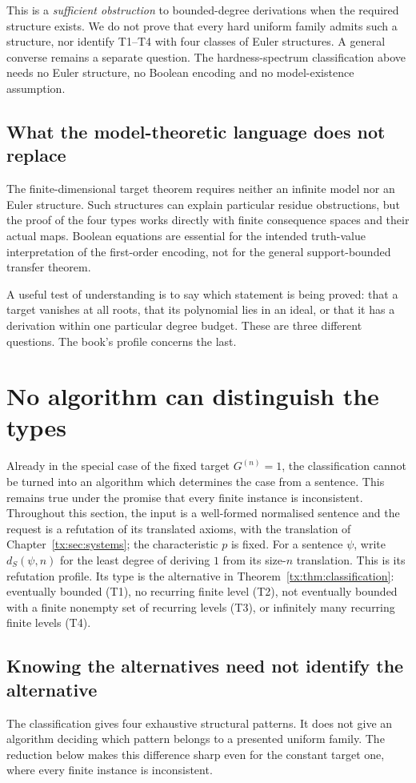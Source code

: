 \documentclass[11pt,a4paper,oneside,openany]{book}
\theoremstyle{definition}\newtheorem{definition}[theorem]{Definition}
\theoremstyle{remark}\newtheorem{remark}[theorem]{Remark}
\numberwithin{equation}{chapter}
\begin{document}
This is a \emph{sufficient obstruction} to bounded-degree derivations
when the required structure exists. We do not prove that every hard
uniform family admits such a structure, nor identify T1--T4 with four
classes of Euler structures. A general converse remains a separate
question. The hardness-spectrum classification above needs no Euler
structure, no Boolean encoding and no model-existence assumption.

\section{What the model-theoretic language does not replace}
The finite-dimensional target theorem requires neither an infinite model
nor an Euler structure. Such structures can explain particular residue
obstructions, but the proof of the four types works directly with finite
consequence spaces and their actual maps. Boolean equations are essential
for the intended truth-value interpretation of the first-order encoding,
not for the general support-bounded transfer theorem.

A useful test of understanding is to say which statement is being proved:
that a target vanishes at all roots, that its polynomial lies in an ideal,
or that it has a derivation within one particular degree budget. These
are three different questions. The book's profile concerns the last.

\chapter{No algorithm can distinguish the types}\label{tx:sec:undecidability}
Already in the special case of the fixed target $G^{(n)}=1$, the
classification cannot be turned into an algorithm
which determines the case from a sentence. This remains true under the
promise that every finite instance is inconsistent. Throughout this section,
the input is a well-formed normalised sentence and the request is a
refutation of its translated axioms, with the translation of
Chapter~\ref{tx:sec:systems}; the characteristic $p$ is fixed.
For a sentence $\psi$, write $d_S(\psi,n)$ for the least degree of
deriving $1$ from its size-$n$ translation. This is its refutation
profile. Its type is the alternative in Theorem~\ref{tx:thm:classification}:
eventually bounded (T1), no recurring finite level (T2), not eventually bounded with
a finite nonempty set of recurring levels (T3), or infinitely many
recurring finite levels (T4).

\section{Knowing the alternatives need not identify the alternative}
The classification gives four exhaustive structural patterns. It does
not give an algorithm deciding which pattern belongs to a presented
uniform family. The reduction below makes this difference sharp even
for the constant target one, where every finite instance is inconsistent.
\end{document}
